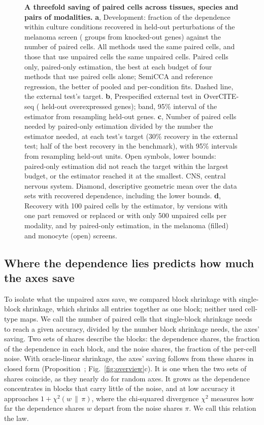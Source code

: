 \documentclass[pdflatex,sn-vancouver-num,iicol]{sn-jnl}
\begin{document}
\begin{figure}[tp]
\centering

\caption{\textbf{A threefold saving of paired cells across tissues, species and pairs of modalities.}
\textbf{a}, Development: fraction of the dependence within culture conditions recovered in held-out perturbations of the melanoma screen (\SpFrGroups{} groups from \SpFrTargets{} knocked-out genes) against the number of paired cells. All methods used the same paired cells, and those that use unpaired cells the same unpaired cells. Paired cells only, paired-only estimation, the best at each budget of four methods that use paired cells alone; SemiCCA and reference regression, the better of pooled and per-condition fits. Dashed line, the external test's target.
\textbf{b}, Prespecified external test in OverCITE-seq (\SpExOrfs{} held-out overexpressed genes); band, 95\% interval of the estimator from resampling held-out genes.
\textbf{c}, Number of paired cells needed by paired-only estimation divided by the number the estimator needed, at each test's target (30\% recovery in the external test; half of the best recovery in the benchmark), with 95\% intervals from resampling held-out units. Open symbols, lower bounds: paired-only estimation did not reach the target within the largest budget, or the estimator reached it at the smallest. CNS, central nervous system. Diamond, descriptive geometric mean over the \SyNInf{} data sets with recovered dependence, including the lower bounds.
\textbf{d}, Recovery with 100 paired cells by the estimator, by versions with one part removed or replaced or with only 500 unpaired cells per modality, and by paired-only estimation, in the melanoma (filled) and monocyte (open) screens.}
\label{fig:savings}
\end{figure}

\subsection{Where the dependence lies predicts how much the axes save}
To isolate what the unpaired axes save, we compared block shrinkage with single-block shrinkage, which shrinks all entries together as one block; neither used cell-type maps. We call the number of paired cells that single-block shrinkage needs to reach a given accuracy, divided by the number block shrinkage needs, the axes' saving. Two sets of shares describe the blocks: the dependence shares, the fraction of the dependence in each block, and the noise shares, the fraction of the per-cell noise. With oracle-linear shrinkage, the axes' saving follows from these shares in closed form (Proposition~; Fig.~\ref{fig:overview}c). It is one when the two sets of shares coincide, as they nearly do for random axes. It grows as the dependence concentrates in blocks that carry little of the noise, and at low accuracy it approaches $1+\chi^2(w\,\|\,\pi)$, where the chi-squared divergence $\chi^2$ measures how far the dependence shares $w$ depart from the noise shares $\pi$. We call this relation the law.
\end{document}
